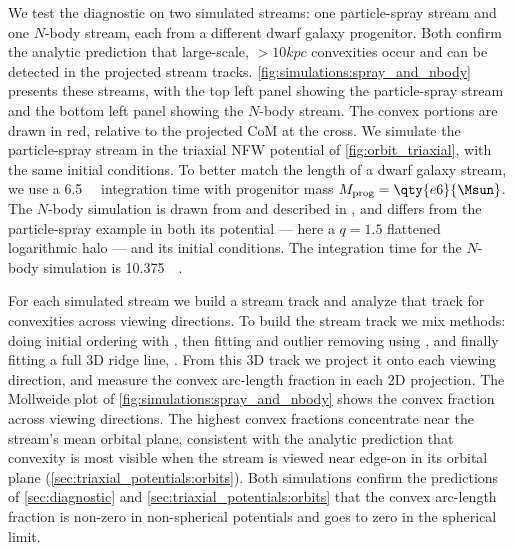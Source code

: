 \documentclass[linenumbers,twocolumn]{aastex701}
\begin{document}
        We test the diagnostic on two simulated streams: one particle-spray stream and one $N$-body stream, each from a different dwarf galaxy progenitor. %
        Both confirm the analytic prediction that large-scale, $>10 kpc$ convexities occur and can be detected in the projected stream tracks. %
        \autoref{fig:simulations:spray_and_nbody} presents these streams, with the top left panel showing the particle-spray stream and the bottom left panel showing the $N$-body stream. %
        The convex portions are drawn in red, relative to the projected \gls{CoM} at the cross. %
        We simulate the particle-spray stream in the triaxial \gls{NFW} potential of \autoref{fig:orbit_triaxial}, with the same initial conditions. %
        To better match the length of a dwarf galaxy stream, we use a \qty{6.5}{\giga\year} integration time with progenitor mass $M_{\rm prog} = \qty{e6}{\Msun}$. %
        The $N$-body simulation is drawn from and described in , and differs from the particle-spray example in both its potential --- here a $q=1.5$ flattened logarithmic halo --- and its initial conditions. %
        The integration time for the $N$-body simulation is \qty{10.375}{\giga\year}. %

        For each simulated stream we build a stream track and analyze that track for convexities across viewing directions. %
        To build the stream track we mix methods: doing initial ordering with  \citep{Wu+:2026:PotamidesMappingDark}, then fitting and outlier removing using  \citep{Starkman+2026:phasecurvefit}, and finally fitting a full 3D ridge line, \citep{Nibauer+:2022,Starkman+:2023:FastTrackStellarStreamPaths}. %
        From this 3D track we project it onto each viewing direction, and measure the convex arc-length fraction in each 2D projection. %
        The Mollweide plot of \autoref{fig:simulations:spray_and_nbody} shows the convex fraction across viewing directions. %
        The highest convex fractions concentrate near the stream's mean orbital plane, consistent with the analytic prediction that convexity is most visible when the stream is viewed near edge-on in its orbital plane (\autoref{sec:triaxial_potentials:orbits}). %
        Both simulations confirm the predictions of \autoref{sec:diagnostic} and \autoref{sec:triaxial_potentials:orbits} that the convex arc-length fraction is non-zero in non-spherical potentials and goes to zero in the spherical limit. %
\end{document}
